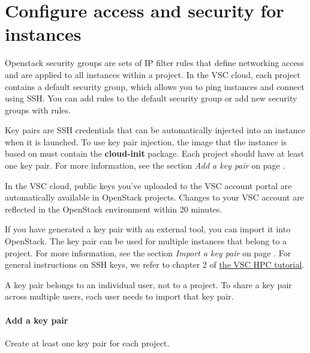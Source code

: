 \chapter{Configure access and security for instances}
Openstack security groups are sets of IP filter rules that define
networking access and are applied to all instances within a project.
In the VSC cloud, each project contains a default security group,
which allows you to ping instances and connect using SSH.  You can add
rules to the default security group or add new security groups with
rules.

Key pairs are SSH credentials that can be automatically injected into
an instance when it is launched. To use key pair injection, the image
that the instance is based on must contain the \textbf{cloud-init}
package. Each project should have at least one key pair. For more
information, see the section \emph{Add a key pair} on page
\pageref{add-a-key-pair}.

 In the VSC cloud, public keys you've uploaded to the
VSC account portal are automatically available in OpenStack projects.
Changes to your VSC account are reflected in the OpenStack environment
within 20 minutes.

If you have generated a key pair with an external tool, you can import
it into \gls{OpenStack}. The key pair can be used for multiple
instances that belong to a project. For more information, see the
section {\emph{Import a key pair}} on page
\pageref{import-a-key-pair}.  For general instructions on SSH keys, we
refer to chapter 2 of
\href{https://www.vscentrum.be/support/tut-book/vsc-tutorials}{the VSC
  HPC tutorial}.

 A key pair belongs to an individual user, not to a
project. To share a key pair across multiple users, each user needs to
import that key pair.

\subsubsection{Add a key pair}\label{add-a-key-pair}
Create at least one key pair for each project.

